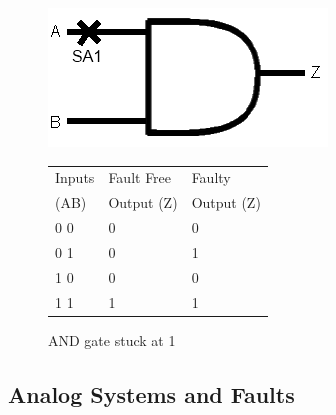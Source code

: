 \documentclass[12pt]{report}
\begin{document}
\begin{figure}
	\begin{center}
	\begin{minipage}[l]{.45\textwidth}
		\includegraphics[scale=.7]{images/and-gate}
	\end{minipage}
	\begin{minipage}[r]{.45\textwidth}
		\begin{tabular}{|l|l|l|}
			\hline
			Inputs & Fault Free & Faulty \\
			(AB) & Output (Z) & Output (Z) \\ \hline
			0 0 & 0 & 0 \\ \hline
			0 1 & 0 & 1 \\ \hline
			1 0 & 0 & 0 \\ \hline
			1 1 & 1 & 1 \\ \hline
		\end{tabular}
	\end{minipage}
	\end{center}
	\caption{AND gate stuck at 1\cite{stroud}}
	\label{fig:andtruth}
\end{figure}

\subsection{Analog Systems and Faults}
\end{document}
